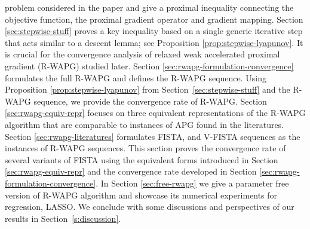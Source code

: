 \documentclass[12pt]{article}
\begin{document}
        problem considered in the paper and give a proximal inequality connecting the objective function,
        the proximal gradient
        operator and gradient mapping.
        Section \ref{sec:stepwise-stuff} proves 
        a key inequality based on a single generic iterative step that acts similar to a descent lemma; see Proposition \ref{prop:stepwise-lyapunov}. It is crucial for the convergence analysis of relaxed weak accelerated proximal gradient (R-WAPG) studied later.
        Section \ref{sec:rwapg-formulation-convergence} formulates the full R-WAPG and defines the R-WAPG sequence. Using Proposition \ref{prop:stepwise-lyapunov} from Section~\ref{sec:stepwise-stuff}
         and the R-WAPG sequence, 
        we provide the convergence rate of R-WAPG.
        Section \ref{sec:rwapg-equiv-repr} focuses on three equivalent representations of the R-WAPG algorithm that are comparable to instances of APG found in the literatures.
        Section \ref{sec:rwapg-literatures} formulates FISTA, and V-FISTA sequences as the instances of R-WAPG sequences.
        This section proves the convergence rate of several variants of FISTA using the equivalent forms introduced in Section \ref{sec:rwapg-equiv-repr} and the convergence rate developed in Section \ref{sec:rwapg-formulation-convergence}.
        In Section \ref{sec:free-rwapg} we give a parameter free version of R-WAPG algorithm and showcase its numerical experiments for regression, LASSO. We conclude with some discussions and perspectives of our results in Section~\ref{s:discussion}. 
\end{document}
